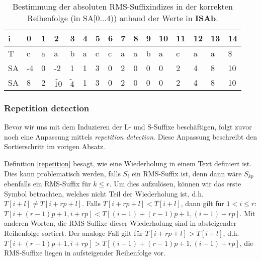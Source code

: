 \begin{table}
	\begin{tabular}{l|lllllllllllllll}
		i  & 0                         & 1                         & 2                                        & 3                                       & 4 & 5 & 6 & 7 & 8 & 9 & 10 & 11 & 12 & 13 & 14 \\ \hline
		T  & c                         & a                         & a                                        & b                                       & a & c & c & a & a & b & a  & c  & a  & a  & \$ \\ \hline
		SA & -4                        & 0                         & -2                                       & 1                                       & 1 & 3 & 0 & 2 & 0 & 0 & 0  & 2  & 4  & 8  & 10 \\ \hline
		SA & \cellcolor[HTML]{32CB00}8 & \cellcolor[HTML]{32CB00}2 & \cellcolor[HTML]{32CB00}$\widetilde{10}$ & \cellcolor[HTML]{32CB00}$\widetilde{4}$ & 1 & 3 & 0 & 2 & 0 & 0 & 0  & 2  & 4  & 8  & 10 \\ \hline
	\end{tabular}
	\caption{Bestimmung der absoluten RMS-Suffixindizes in der korrekten Reihenfolge (in SA$[0\dots 4)$) anhand der Werte in \textbf{ISAb}.}
	\label{dss:table:correct-indices}
\end{table}

\subsubsection{Repetition detection}
Bevor wir uns mit dem Induzieren der L- und S-Suffixe beschäftigen, folgt zuvor noch eine Anpassung mittels \textit{repetition detection}. Diese Anpassung beschreibt den Sortierschritt im vorigen Absatz.

Definition \ref{repetition} besagt, wie eine Wiederholung in einem Text definiert ist. Dies kann problematisch werden, falls $S_i$ ein RMS-Suffix ist, denn dann wäre $S_{kp}$ ebenfalls ein RMS-Suffix für $k \leq r$. Um dies aufzulösen, können wir das erste Symbol betrachten, welches nicht Teil der Wiederholung ist, d.h. $T[i + l] \neq T[i + rp + l]$. Falls $T[i + rp + l] < T[i + l]$, dann gilt für $1 < i \leq r$:$T[i + (r-1)p + 1, i+rp] < T[(i-1) + (r-1)p + 1, (i-1) + rp]$. Mit anderen Worten, die RMS-Suffixe dieser Wiederholung sind in absteigender Reihenfolge sortiert. Der analoge Fall gilt für $T[i + rp + l] > T[i + l]$, d.h. $T[i + (r-1)p + 1, i + rp] > T[(i-1) + (r-1)p + 1, (i-1) + rp]$, die RMS-Suffixe liegen in aufsteigender Reihenfolge vor.

